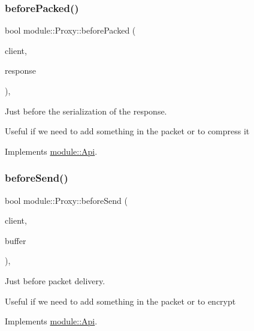 \subsubsection{\texorpdfstring{before\+Packed()}{beforePacked()}}
{\footnotesize\ttfamily bool module\+::\+Proxy\+::before\+Packed (\begin{DoxyParamCaption}\item[{const \hyperlink{structnet_1_1IClient}{net\+::\+I\+Client} \&}]{client,  }\item[{\hyperlink{structhttp_1_1IResponse}{http\+::\+I\+Response} \&}]{response }\end{DoxyParamCaption})\hspace{0.3cm}{\ttfamily [virtual]}, {\ttfamily [noexcept]}}



Just before the serialization of the response. 

Useful if we need to add something in the packet or to compress it 

Implements \hyperlink{structmodule_1_1Api_a5293babe6b28a397b7a11f32da0a6f51}{module\+::\+Api}.

\mbox{\label{classmodule_1_1Proxy_a314d53ca09edbb7f2595cefb5c55771e}} 
\subsubsection{\texorpdfstring{before\+Send()}{beforeSend()}}
{\footnotesize\ttfamily bool module\+::\+Proxy\+::before\+Send (\begin{DoxyParamCaption}\item[{const \hyperlink{structnet_1_1IClient}{net\+::\+I\+Client} \&}]{client,  }\item[{std\+::string \&}]{buffer }\end{DoxyParamCaption})\hspace{0.3cm}{\ttfamily [virtual]}, {\ttfamily [noexcept]}}



Just before packet delivery. 

Useful if we need to add something in the packet or to encrypt 

Implements \hyperlink{structmodule_1_1Api_a71d1ada8bc5fc81fd71607315dd86185}{module\+::\+Api}.

\mbox{\label{classmodule_1_1Proxy_aa80f5772c7c4613060f4cf49f1fc00e4}} 
